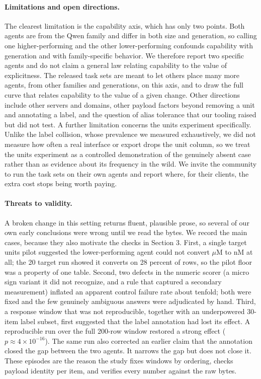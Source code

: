 \documentclass[sigconf]{ceurart}
\begin{document}
\paragraph{Limitations and open directions.}
The clearest limitation is the capability axis, which has only two points. Both
agents are from the Qwen family and differ in both size and generation, so calling
one higher-performing and the other lower-performing confounds capability with
generation and with family-specific behavior. We therefore report two specific
agents and do not claim a general law relating capability to the value of
explicitness. The released task sets are meant to let others place many more
agents, from other families and generations, on this axis, and to draw the full
curve that relates capability to the value of a given change. Other directions
include other servers and domains, other payload factors beyond removing a unit and
annotating a label, and the question of alias tolerance that our tooling raised but
did not test. A further limitation concerns the units experiment specifically. Unlike the
label collision, whose prevalence we measured exhaustively, we did not measure how
often a real interface or export drops the unit column, so we treat the units experiment
as a controlled demonstration of the genuinely absent case rather than as evidence
about its frequency in the wild. We invite the community to run the task sets on their own agents and
report where, for their clients, the extra cost stops being worth paying.

\paragraph{Threats to validity.}
A broken change in this setting returns fluent, plausible prose, so several of our
own early conclusions were wrong until we read the bytes. We record the main cases,
because they also motivate the checks in Section 3. First, a single target units
pilot suggested the lower-performing agent could not convert $\mu$M to nM at all; the 20
target run showed it converts on 28 percent of rows, so the pilot floor was a
property of one table. Second, two defects in the numeric scorer (a micro sign
variant it did not recognize, and a rule that captured a secondary measurement)
inflated an apparent control failure rate about tenfold; both were fixed and the
few genuinely ambiguous answers were adjudicated by hand. Third, a response window
that was not reproducible, together with an underpowered 30-item label subset,
first suggested that the label annotation had lost its effect. A reproducible run
over the full 200-row window restored a strong effect ($p \approx 4\times10^{-16}$).
The same run also corrected an earlier claim that the annotation closed the gap
between the two agents. It narrows the gap but does not close it. These
episodes are the reason the study fixes windows by ordering, checks payload
identity per item, and verifies every number against the raw bytes.
\end{document}
